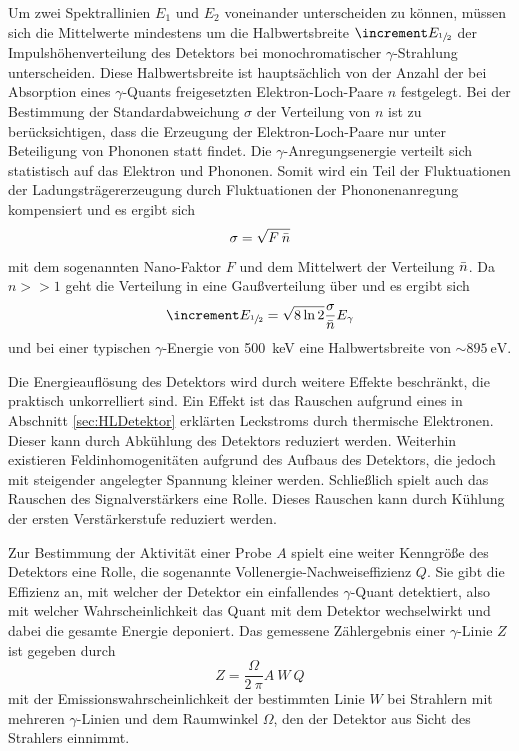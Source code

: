 Um zwei Spektrallinien $E_1$ und $E_2$ voneinander unterscheiden zu können, müssen
sich die Mittelwerte mindestens um die Halbwertsbreite $\increment E_{\sfrac{1}{2}}$
der Impulshöhenverteilung des Detektors bei monochromatischer $\gamma$-Strahlung unterscheiden.
Diese Halbwertsbreite ist hauptsächlich von der Anzahl der bei Absorption eines $\gamma$-Quants
freigesetzten Elektron-Loch-Paare $n$ festgelegt.
Bei der Bestimmung der Standardabweichung $\sigma$ der Verteilung von $n$ ist zu berücksichtigen, dass die
Erzeugung der Elektron-Loch-Paare nur unter Beteiligung von Phononen statt findet.
Die $\gamma$-Anregungsenergie verteilt sich statistisch auf das Elektron und Phononen.
Somit wird ein Teil der Fluktuationen der Ladungsträgererzeugung durch Fluktuationen der
Phononenanregung kompensiert und es ergibt sich
\begin{equation}
	\sigma = \sqrt{F\:\bar{n}}
\end{equation}
mit dem sogenannten Nano-Faktor $F$ und dem Mittelwert der Verteilung $\bar{n}$.
Da $n >> 1$ geht die Verteilung in eine Gaußverteilung über und es ergibt sich
\begin{equation}
	\increment E_{\sfrac{1}{2}} = \sqrt{8 \ln2} \frac{\sigma}{\mean{n}} E_\gamma
\end{equation}
und bei einer typischen $\gamma$-Energie von \SI{500}{\kilo\electronvolt} eine
Halbwertsbreite von $\sim \SI{895}{\electronvolt}$.

Die Energieauflösung des Detektors wird durch weitere Effekte beschränkt, die praktisch unkorrelliert sind.
Ein Effekt ist das Rauschen aufgrund eines in Abschnitt \ref{sec:HLDetektor} erklärten Leckstroms
durch thermische Elektronen. Dieser kann durch Abkühlung des Detektors reduziert werden.
Weiterhin existieren Feldinhomogenitäten aufgrund des Aufbaus des Detektors, die jedoch
mit steigender angelegter Spannung kleiner werden.
Schließlich spielt auch das Rauschen des Signalverstärkers eine Rolle. Dieses Rauschen
kann durch Kühlung der ersten Verstärkerstufe reduziert werden.

Zur Bestimmung der Aktivität einer Probe $A$ spielt eine weiter Kenngröße des Detektors eine
Rolle, die sogenannte Vollenergie-Nachweiseffizienz $Q$.
Sie gibt die Effizienz an, mit welcher der Detektor ein einfallendes $\gamma$-Quant
detektiert, also mit welcher Wahrscheinlichkeit das Quant mit dem Detektor
wechselwirkt und dabei die gesamte Energie deponiert.
Das gemessene Zählergebnis einer $\gamma$-Linie $Z$ ist gegeben durch
\begin{equation}
	Z = \frac{\Omega}{2\:\pi} A\:W\:Q
	\label{eqn:Vollenergie-Nachweiseffizienz}
\end{equation}
mit der Emissionswahrscheinlichkeit der bestimmten Linie $W$ bei Strahlern mit mehreren
$\gamma$-Linien und dem Raumwinkel $\Omega$, den der Detektor aus Sicht des Strahlers einnimmt.

